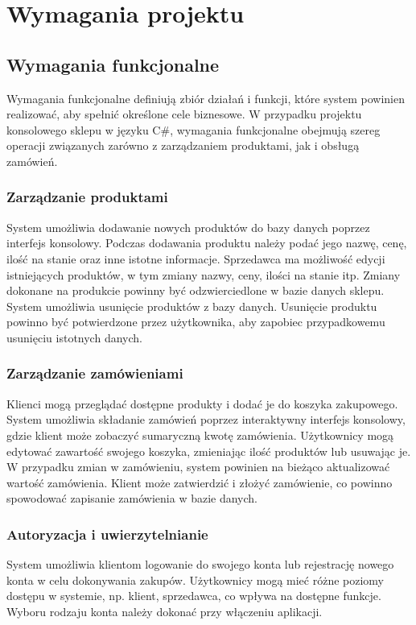 \chapter{Wymagania projektu}
\section{Wymagania funkcjonalne}
Wymagania funkcjonalne definiują zbiór działań i funkcji, które system powinien realizować, aby spełnić określone cele biznesowe. W przypadku projektu konsolowego sklepu w języku C\#, wymagania funkcjonalne obejmują szereg operacji związanych zarówno z zarządzaniem produktami, jak i obsługą zamówień.

\subsection{Zarządzanie produktami}
System umożliwia dodawanie nowych produktów do bazy danych poprzez interfejs konsolowy. Podczas dodawania produktu należy podać jego nazwę, cenę, ilość na stanie oraz inne istotne informacje. Sprzedawca ma możliwość edycji istniejących produktów, w tym zmiany nazwy, ceny, ilości na stanie itp. Zmiany dokonane na produkcie powinny być odzwierciedlone w bazie danych sklepu. System umożliwia usunięcie produktów z bazy danych. Usunięcie produktu powinno być potwierdzone przez użytkownika, aby zapobiec przypadkowemu usunięciu istotnych danych.

\subsection{Zarządzanie zamówieniami}
Klienci mogą przeglądać dostępne produkty i dodać je do koszyka zakupowego. System umożliwia składanie zamówień poprzez interaktywny interfejs konsolowy, gdzie klient może zobaczyć sumaryczną kwotę zamówienia. Użytkownicy mogą edytować zawartość swojego koszyka, zmieniając ilość produktów lub usuwając je.
W przypadku zmian w zamówieniu, system powinien na bieżąco aktualizować wartość zamówienia. Klient może zatwierdzić i złożyć zamówienie, co powinno spowodować zapisanie zamówienia w bazie danych.

\subsection{Autoryzacja i uwierzytelnianie}
System umożliwia klientom logowanie do swojego konta lub rejestrację nowego konta w celu dokonywania zakupów. Użytkownicy mogą mieć różne poziomy dostępu w systemie, np. klient, sprzedawca, co wpływa na dostępne funkcje. Wyboru rodzaju konta należy dokonać przy włączeniu aplikacji.

